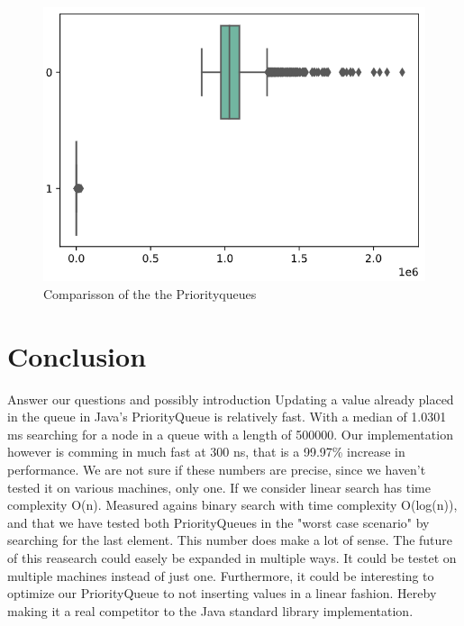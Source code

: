 \documentclass{article}
\begin{document}
\begin{figure}[h]
\label{img:boxplot_comparisson}
\includegraphics[width=\textwidth]{boxplot_comparisson}
\caption{Comparisson of the the Priorityqueues}
\end{figure}


\section{Conclusion} %
Answer our questions and possibly introduction
Updating a value already placed in the queue in Java's PriorityQueue is relatively
fast. With a median of 1.0301 ms searching for a node in a queue with a length of 
500000. Our implementation however is comming in much fast at 300 ns, that is a 99.97\% 
increase in performance. We are not sure if these numbers are precise, since we haven't 
tested it on various machines, only one. If we consider linear search has time complexity O(n).
Measured agains binary search with time complexity O(log(n)), and that we have tested both 
PriorityQueues in the "worst case scenario" by searching for the last element. This number
does make a lot of sense. The future of this reasearch could easely be expanded in multiple ways.
It could be testet on multiple machines instead of just one. Furthermore, it could be interesting
to optimize our PriorityQueue to not inserting values in a linear fashion. Hereby making it a 
real competitor to the Java standard library implementation.




\end{document}
